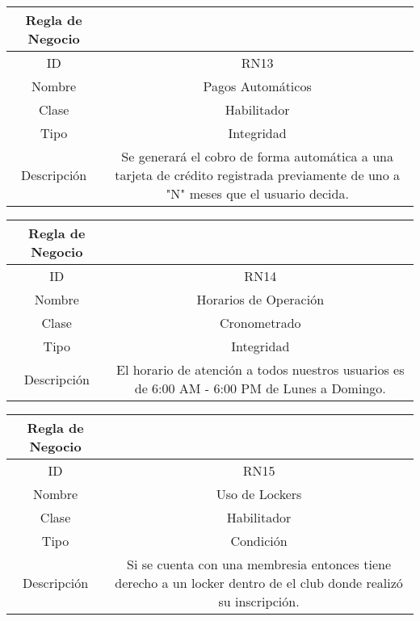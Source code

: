 \documentclass{article}
\begin{document}
\begin{center}
\begin{tabular}{ |c|c| } 
 \hline
 Regla de Negocio & \\
 \hline
 ID & RN13 \\ 
  \hline
  Nombre & Pagos Automáticos\\ 
  \hline
  Clase & Habilitador\\ 
  \hline
  Tipo &  Integridad\\ 
  \hline
  Descripción & Se generará el cobro de forma automática a una tarjeta de crédito registrada previamente de uno a "N" meses que el usuario decida.\\ 
   \hline
 \hline
\end{tabular}
\end{center}

\begin{center}
\begin{tabular}{ |c|c| } 
 \hline
 Regla de Negocio & \\
 \hline
 ID & RN14 \\ 
  \hline
  Nombre & Horarios de Operación\\ 
  \hline
  Clase & Cronometrado\\ 
  \hline
  Tipo &  Integridad\\ 
  \hline
  Descripción & El horario de atención a todos nuestros usuarios es de 6:00 AM - 6:00 PM de Lunes a Domingo.\\ 
   \hline
 \hline
\end{tabular}
\end{center}

\begin{center}
\begin{tabular}{ |c|c| } 
 \hline
 Regla de Negocio & \\
 \hline
 ID & RN15 \\ 
  \hline
  Nombre & Uso de Lockers\\ 
  \hline
  Clase & Habilitador\\ 
  \hline
  Tipo &  Condición\\ 
  \hline
  Descripción & Si se cuenta con una membresia entonces tiene derecho a un locker dentro de el club donde realizó su inscripción.\\ 
   \hline
 \hline
\end{tabular}
\end{center}
\end{document}
